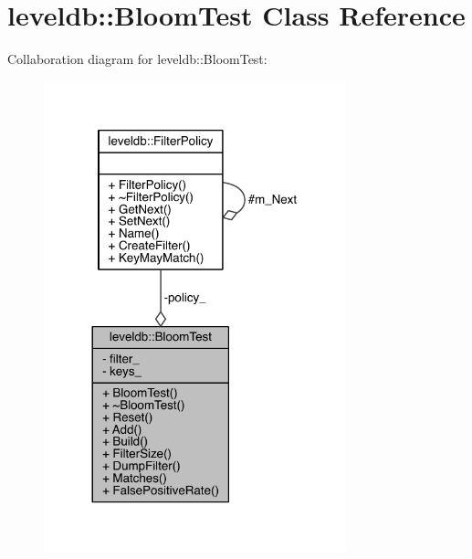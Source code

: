 \hypertarget{classleveldb_1_1_bloom_test}{}\section{leveldb\+:\+:Bloom\+Test Class Reference}
\label{classleveldb_1_1_bloom_test}


Collaboration diagram for leveldb\+:\+:Bloom\+Test\+:\nopagebreak
\begin{figure}[H]
\begin{center}
\leavevmode
\includegraphics[width=248pt]{classleveldb_1_1_bloom_test__coll__graph}
\end{center}
\end{figure}
